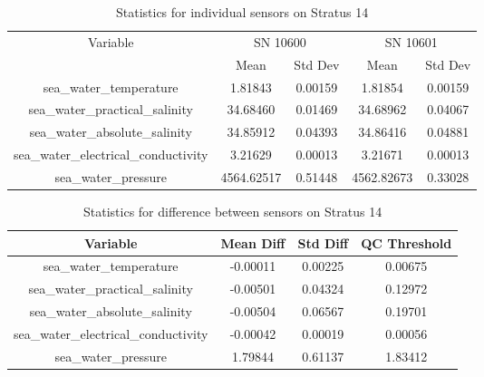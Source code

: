 \begin{table}[h]
\centering
\begin{tabular}{|c|c|c|c|c|}
\hline
Variable & \multicolumn{2}{c|}{SN 10600} & \multicolumn{2}{c|}{SN 10601} \\
& Mean & Std Dev & Mean & Std Dev \\
\hline
sea\_water\_temperature & 1.81843 & 0.00159 & 1.81854 & 0.00159 \\
sea\_water\_practical\_salinity & 34.68460 & 0.01469 & 34.68962 & 0.04067 \\
sea\_water\_absolute\_salinity & 34.85912 & 0.04393 & 34.86416 & 0.04881 \\
sea\_water\_electrical\_conductivity & 3.21629 & 0.00013 & 3.21671 & 0.00013 \\
sea\_water\_pressure & 4564.62517 & 0.51448 & 4562.82673 & 0.33028 \\
\hline
\end{tabular}
\caption{Statistics for individual sensors on Stratus 14}
\end{table}

\begin{table}[h]
\centering
\begin{tabular}{|c|c|c|c|}
\hline
Variable & Mean Diff & Std Diff & QC Threshold \\
\hline
sea\_water\_temperature & -0.00011 & 0.00225 & 0.00675 \\
sea\_water\_practical\_salinity & -0.00501 & 0.04324 & 0.12972 \\
sea\_water\_absolute\_salinity & -0.00504 & 0.06567 & 0.19701 \\
sea\_water\_electrical\_conductivity & -0.00042 & 0.00019 & 0.00056 \\
sea\_water\_pressure & 1.79844 & 0.61137 & 1.83412 \\
\hline
\end{tabular}
\caption{Statistics for difference between sensors on Stratus 14}
\end{table}
